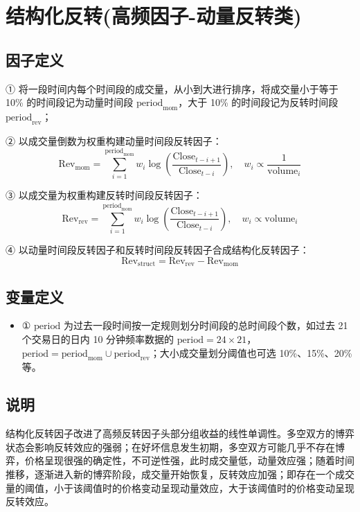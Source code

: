 \documentclass{article}
\begin{document}
\section{结构化反转(高频因子-动量反转类)}

\subsection{因子定义}

① 将一段时间内每个时间段的成交量，从小到大进行排序，将成交量小于等于 10\% 的时间段记为动量时间段 \(\mathrm{period}_{\mathrm{mom}}\)，大于 10\% 的时间段记为反转时间段 \(\mathrm{period}_{\mathrm{rev}}\)；

② 以成交量倒数为权重构建动量时间段反转因子：
\begin{equation}
    \mathrm{Rev}_{\mathrm{mom}} = \sum_{i=1}^{\mathrm{period}_{\mathrm{mom}}} w_i \log \left( \frac{\mathrm{Close}_{t-i+1}}{\mathrm{Close}_{t-i}} \right), \quad w_i \propto \frac{1}{\mathrm{volume}_i}
\end{equation}

③ 以成交量为权重构建反转时间段反转因子：
\begin{equation}
    \mathrm{Rev}_{\mathrm{rev}} = \sum_{i=1}^{\mathrm{period}_{\mathrm{mom}}} w_i \log \left( \frac{\mathrm{Close}_{t-i+1}}{\mathrm{Close}_{t-i}} \right), \quad w_i \propto \mathrm{volume}_i
\end{equation}

④ 以动量时间段反转因子和反转时间段反转因子合成结构化反转因子：
\begin{equation}
    \mathrm{Rev}_{\mathrm{struct}} = \mathrm{Rev}_{\mathrm{rev}} - \mathrm{Rev}_{\mathrm{mom}}
\end{equation}

\subsection{变量定义}
\begin{itemize}
    \item ① \(\mathrm{period}\) 为过去一段时间按一定规则划分时间段的总时间段个数，如过去 21 个交易日的日内 10 分钟频率数据的 \(\mathrm{period}=24 \times 21\)，\(\mathrm{period} = \mathrm{period}_{\mathrm{mom}} \cup \mathrm{period}_{\mathrm{rev}}\)；大小成交量划分阈值也可选 10\%、15\%、20\% 等。
\end{itemize}

\subsection{说明}
结构化反转因子改进了高频反转因子头部分组收益的线性单调性。多空双方的博弈状态会影响反转效应的强弱；在好坏信息发生初期，多空双方可能几乎不存在博弈，价格呈现很强的确定性，不可逆性强，此时成交量低，动量效应强；随着时间推移，逐渐进入新的博弈阶段，成交量开始恢复，反转效应加强；即存在一个成交量的阈值，小于该阈值时的价格变动呈现动量效应，大于该阈值时的价格变动呈现反转效应。
\end{document}
